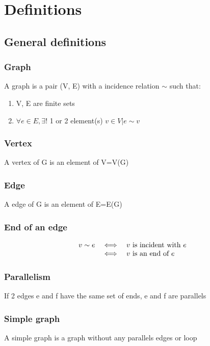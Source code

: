 \chapter{Definitions}

\section{General definitions}
    \subsection{Graph}
        A graph is a pair (V, E) with a incidence relation $\sim$ such that:
        \begin{enumerate}
            \item V, E are finite sets
            \item $\forall e \in E, \exists !$ 1 or 2 element(s) $v \in V | e \sim v$
        \end{enumerate}
    \subsection{Vertex}
        A vertex of G is an element of V=V(G)
    \subsection{Edge}
        A edge of G is an element of E=E(G)
    \subsection{End of an edge}
        \[\begin{array}{r c l}
            v \sim e & \iff & v \text{ is incident with }e \\
            & \iff & v\text{ is an end of }e
        \end{array}\]
    \subsection{Parallelism}
        If 2 edges e and f have the same set of ends, e and f are parallels
    \subsection{Simple graph}
        A simple graph is a graph without any parallels edges or loop
